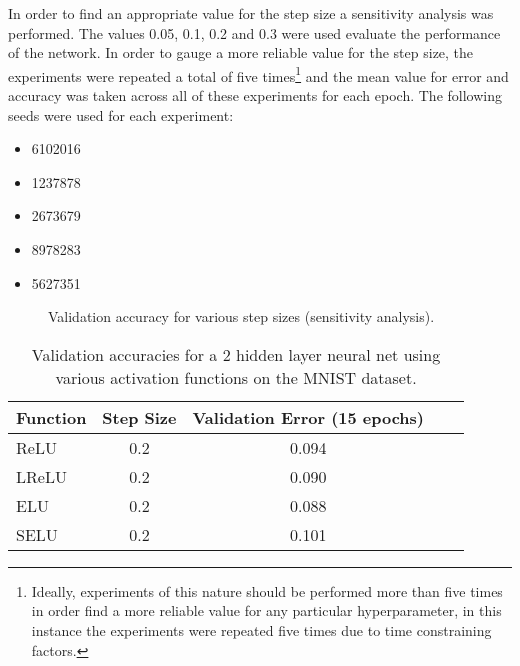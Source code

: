 \documentclass{article}
\begin{document}
In order to find an appropriate value for the step size a sensitivity analysis was performed. The values 0.05, 0.1, 0.2 and 0.3 were used evaluate the performance of the network. In order to gauge a more reliable value for the step size, the experiments were repeated a total of five times\footnote{Ideally, experiments of this nature should be performed more than five times in order find a more reliable value for any particular hyperparameter, in this instance the experiments were repeated five times due to time constraining factors.} and the mean value for error and accuracy was taken across all of these experiments for each epoch. The following seeds were used for each experiment:

\begin{itemize}
  \item 6102016
  \item 1237878
  \item 2673679
  \item 8978283
  \item 5627351
\end{itemize}

\begin{figure}[tb]
\vskip 5mm
\begin{center}
\centerline{}
\caption{Validation accuracy for various step sizes (sensitivity analysis).}
\label{fig:sens-analysis-val-acc}
\end{center}
\vskip -5mm
\end{figure}

\begin{table}[tb]
\vskip 3mm
\begin{center}
\begin{small}
\begin{sc}
\begin{tabular}{lcccr}
\hline
\abovespace\belowspace
Function & Step Size & Validation Error (15 epochs) \\
\hline
\abovespace
ReLU    & 0.2& 0.094 \\
LReLU & 0.2& 0.090 \\
ELU    & 0.2& 0.088 \\
\belowspace
SELU    & 0.2& 0.101 \\
\hline
\end{tabular}
\end{sc}
\end{small}
\caption{Validation accuracies for a 2 hidden layer neural net using 
various activation functions on the MNIST dataset.}
\label{tab:MNIST-table}
\end{center}
\vskip -3mm
\end{table}
\end{document}
